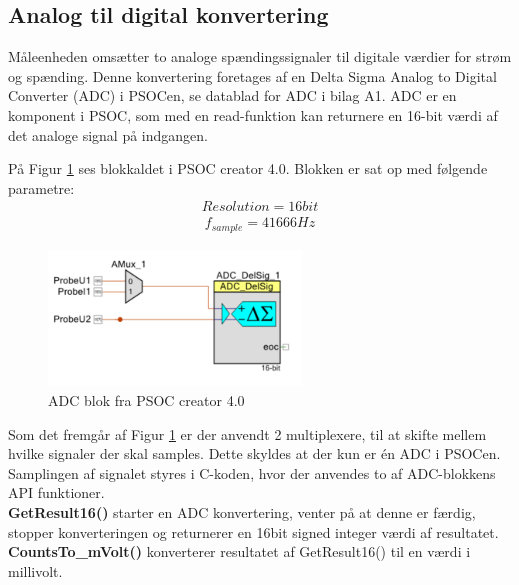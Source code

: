 
\subsection{Analog til digital konvertering}

Måleenheden omsætter to analoge spændingssignaler til digitale værdier for strøm og spænding. Denne konvertering foretages af en Delta Sigma Analog to Digital Converter (ADC) i PSOCen, se datablad for ADC i bilag A1.  ADC er en komponent i PSOC, som med en read-funktion kan returnere en 16-bit værdi af det analoge signal på indgangen. 

På Figur \ref{fig:MEADC} ses blokkaldet i PSOC creator 4.0. Blokken er sat op med følgende parametre:
\begin{align}
Resolution = 16bit
\end{align}
\begin{align}
f_{sample} = 41666 Hz
\end{align}

\begin{figure}[htbp] %
	\centering
	\includegraphics[width=0.6\textwidth]{Figure/MEADC}
	\caption{ADC blok fra PSOC creator 4.0}
	\label{fig:MEADC}
\end{figure}

Som det fremgår af Figur \ref{fig:MEADC} er der anvendt 2 multiplexere, til at skifte mellem hvilke signaler der skal samples. Dette skyldes at der kun er én ADC i PSOCen. Samplingen af signalet styres i C-koden, hvor der anvendes to af ADC-blokkens API funktioner. 
\\

\textbf{GetResult16() }starter en ADC konvertering, venter på at denne er færdig, stopper konverteringen og returnerer en 16bit signed integer værdi af resultatet. 
\\

\textbf{CountsTo\_mVolt()} konverterer resultatet af GetResult16() til en værdi i millivolt. 
\\

